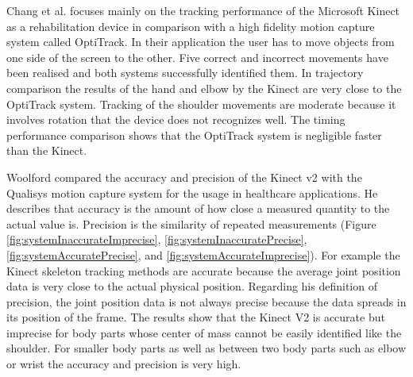 
Chang et al. \cite{Chang2012-hz} focuses mainly on the tracking performance of the Microsoft Kinect as a rehabilitation device in comparison with a high fidelity motion capture system called OptiTrack. In their application the user has to move objects from one side of the screen to the other. Five correct and incorrect movements have been realised and both systems successfully identified them. In trajectory comparison the results of the hand and elbow by the Kinect are very close to the OptiTrack system. Tracking of the shoulder movements are moderate because it involves rotation that the device does not recognizes well. The timing performance comparison shows that the OptiTrack system is negligible faster than the Kinect.

Woolford \cite{Woolford2015-ub} compared the accuracy and precision of the Kinect v2 with the Qualisys motion capture system for the usage in healthcare applications. He describes that accuracy is the amount of how close a measured quantity to the actual value is. Precision is the similarity of repeated measurements (Figure \ref{fig:systemInaccurateImprecise}, \ref{fig:systemInaccuratePrecise}, \ref{fig:systemAccuratePrecise}, and \ref{fig:systemAccurateImprecise}). For example the Kinect skeleton tracking methods are accurate because the average joint position data is very close to the actual physical position. Regarding his definition of precision, the joint position data is not always precise because the data spreads in its position of the frame. The results show that the Kinect V2 is accurate but imprecise for body parts whose center of mass cannot be easily identified like the shoulder. For smaller body parts as well as between two body parts such as elbow or wrist the accuracy and precision is very high. 

